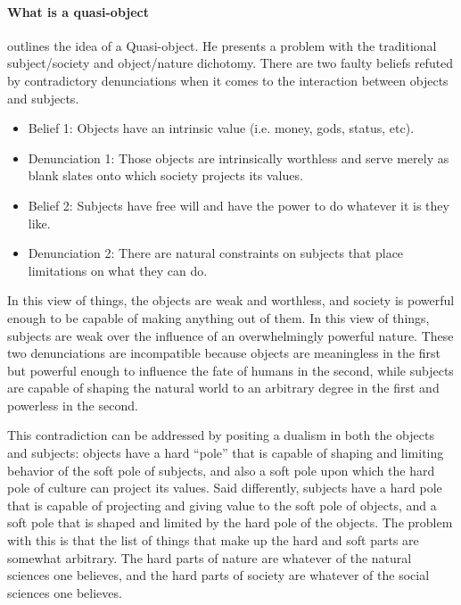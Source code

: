 \documentclass[a4paper]{article}
\begin{document}
\paragraph{What is a quasi-object}

\cite{latour2012we} outlines the idea of a Quasi-object. He presents a problem
with the traditional subject/society and object/nature dichotomy. There are
two faulty beliefs refuted by contradictory denunciations when it comes to the
interaction between objects and subjects. 
%
\begin{itemize}
    \item[] Belief 1: Objects have an intrinsic value (i.e. money, gods,
        status, etc). 

    \item[] Denunciation 1: Those objects are intrinsically worthless and
        serve merely as blank slates onto which society projects its values.

    \item[] Belief 2: Subjects have free will and have the power to do whatever
        it is they like.

    \item[] Denunciation 2: There are natural constraints on subjects that
        place limitations on what they can do.  \end{itemize}
%
In this view of things, the objects are weak and worthless, and society is
powerful enough to be capable of making anything out of them.  In this view of
things, subjects are weak over the influence of an overwhelmingly powerful
nature.  These two denunciations are incompatible because objects are
meaningless in the first but powerful enough to influence the fate of humans
in the second, while subjects are capable of shaping the natural world to an
arbitrary degree in the first and powerless in the second. 

This contradiction can be addressed by positing a dualism in both the objects
and subjects: objects have a hard ``pole'' that is capable of shaping and
limiting behavior of the soft pole of subjects, and also a soft pole upon
which the hard pole of culture can project its values.  Said differently,
subjects have a hard pole that is capable of projecting and giving value to
the soft pole of objects, and a soft pole that is shaped and limited by the
hard pole of the objects.  The problem with this is that the list of things
that make up the hard and soft parts are somewhat arbitrary. The hard parts of
nature are whatever of the natural sciences one believes, and the hard parts
of society are whatever of the social sciences one believes. 
\end{document}
